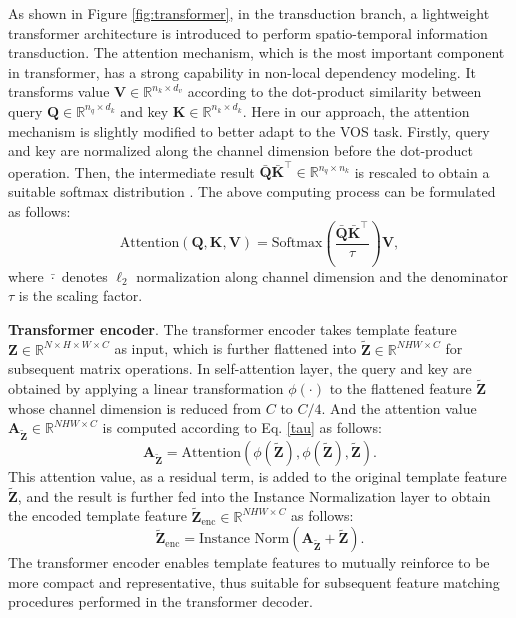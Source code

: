 \documentclass[10pt,twocolumn,letterpaper]{article}
\begin{document}
As shown in Figure \ref{fig:transformer}, in the transduction branch, a lightweight transformer \cite{transformer2017A} architecture is introduced to perform spatio-temporal information transduction. The attention mechanism, which is the most important component in transformer, has a strong capability in non-local dependency modeling. It transforms value $\mathbf{V} \in \mathbb{R}^{n_k \times d_v}$ according to the dot-product similarity between query $\mathbf{Q} \in \mathbb{R}^{n_q \times d_k}$ and key $\mathbf{K} \in \mathbb{R}^{n_k \times d_k}$. Here in our approach, the attention mechanism is slightly modified to better adapt to the VOS task. Firstly, query and key are normalized along the channel dimension before the dot-product operation. Then, the intermediate result $\bar{\mathbf{Q}}\bar{\mathbf{K}}^\top \in \mathbb{R}^{n_q \times n_k}$ is rescaled to obtain a suitable softmax distribution \cite{chen2020simple,hinton2015distilling}. The above computing process can be formulated as follows:
\begin{equation}\label{tau}
	\text{Attention}(\mathbf{Q}, \mathbf{K}, \mathbf{V}) = \text{Softmax}
	\left( \frac{ \bar{\mathbf{Q}}\bar{\mathbf{K}}^\top}{\tau}
	\right)\mathbf{V},
\end{equation}
where $\bar{\cdot}$ denotes $\ell_{2}$ normalization along channel dimension and the denominator $\tau$ is the scaling factor.

\noindent\textbf{Transformer encoder}.
The transformer encoder takes template feature $\mathbf{Z} \in \mathbb{R}^{N \times H \times W \times C}$ as input, which is further flattened into $\widetilde{\mathbf{Z}} \in \mathbb{R}^{NHW \times C }$ for subsequent matrix operations. In self-attention layer, the query and key are obtained by applying a linear transformation $\phi(\cdot)$ to the flattened feature $\widetilde{\mathbf{Z}}$ whose channel dimension is reduced from $C$ to $C/4$. And the attention value $\mathbf{A}_{\widetilde{\mathbf{Z}}} \in \mathbb{R}^{NHW \times C}$ is computed according to Eq. \eqref{tau} as follows:
\begin{equation}
	\mathbf{A}_{\widetilde{\mathbf{Z}}} = 
	\text{Attention}
	\left( \phi(\widetilde{\mathbf{Z}}),\phi(\widetilde{\mathbf{Z}}), \widetilde{\mathbf{Z}}
	\right).
\end{equation}
This attention value, as a residual term, is added to the original template feature $\widetilde{\mathbf{Z}}$, and the result is further fed into the Instance Normalization \cite{instnorm2016A} layer to obtain the encoded template feature $\widetilde{\mathbf{Z}}_{\text{enc}} \in \mathbb{R}^{NHW \times C}$ as follows:
\begin{equation}
	\widetilde{\mathbf{Z}}_{\text{enc}} = \text{Instance Norm}\left(\mathbf{A}_{\widetilde{\mathbf{Z}}} + \widetilde{\mathbf{Z}} \right).
\end{equation}
The transformer encoder enables template features to mutually reinforce to be more compact and representative, thus suitable for subsequent feature matching procedures performed in the transformer decoder.
\end{document}
